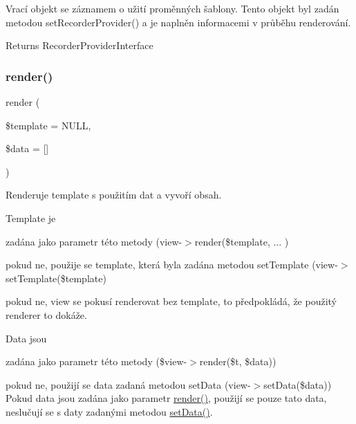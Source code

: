 Vrací objekt se záznamem o užití proměnných šablony. Tento objekt byl zadán metodou set\+Recorder\+Provider() a je naplněn informacemi v průběhu renderování.

\begin{DoxyReturn}{Returns}
Recorder\+Provider\+Interface 
\end{DoxyReturn}
\mbox{\label{class_pes_1_1_view_1_1_view_a62b5a3861ff3b1f8a28911db4c11ae47}} 
\subsubsection{\texorpdfstring{render()}{render()}}
{\footnotesize\ttfamily render (\begin{DoxyParamCaption}\item[{\mbox{\hyperlink{interface_pes_1_1_view_1_1_template_1_1_template_interface}{Template\+Interface}}}]{\$template = {\ttfamily NULL},  }\item[{}]{\$data = {\ttfamily \mbox{[}\mbox{]}} }\end{DoxyParamCaption})}

Renderuje template s použitím dat a vyvoří obsah.

Template je
\begin{DoxyItemize}
\item zadána jako parametr této metody (view-\/$>$render(\$template, ... )
\item pokud ne, použije se template, která byla zadána metodou set\+Template (view-\/$>$set\+Template(\$template)
\item pokud ne, view se pokusí renderovat bez template, to předpokládá, že použitý renderer to dokáže.
\end{DoxyItemize}

Data jsou
\begin{DoxyItemize}
\item zadána jako parametr této metody (\$view-\/$>$render(\$t, \$data))
\item pokud ne, použijí se data zadaná metodou set\+Data (view-\/$>$set\+Data(\$data)) Pokud data jsou zadána jako parametr \mbox{\hyperlink{class_pes_1_1_view_1_1_view_a62b5a3861ff3b1f8a28911db4c11ae47}{render()}}, použijí se pouze tato data, neslučují se s daty zadanými metodou \mbox{\hyperlink{class_pes_1_1_view_1_1_view_a5ae172026b770b4c669fe7478120591c}{set\+Data()}}.
\end{DoxyItemize}

